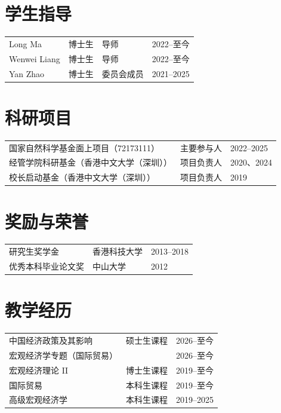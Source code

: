\documentclass[11pt]{res}
\begin{document}
\begin{resume}
\pagebreak
\section{\bf 学生指导}
\vspace{0.1in}
\begin{tabular}{llll}
\hspace{-0.42in} Long Ma      & 博士生 & 导师       & 2022--至今\\
\hspace{-0.42in} Wenwei Liang & 博士生 & 导师       & 2022--至今\\
\hspace{-0.42in} Yan Zhao     & 博士生 & 委员会成员 & 2021--2025
\end{tabular}

\section{\bf 科研项目}
\vspace{0.1in}
\begin{tabular}{lll}
\hspace{-0.42in} 国家自然科学基金面上项目（72173111）
  & 主要参与人 & 2022--2025\\
\hspace{-0.42in} 经管学院科研基金（香港中文大学（深圳））
  & 项目负责人 & 2020、2024\\
\hspace{-0.42in} 校长启动基金（香港中文大学（深圳））
  & 项目负责人 & 2019
\end{tabular}

\section{\bf 奖励与荣誉}
\vspace{0.1in}
\begin{tabular}{lll}
\hspace{-0.42in} 研究生奖学金
  & 香港科技大学 & 2013--2018\\
\hspace{-0.42in} 优秀本科毕业论文奖
  & 中山大学 & 2012
\end{tabular}

\section{\bf 教学经历}
\vspace{0.1in}
\begin{tabular}{lll}
\hspace{-0.42in} 中国经济政策及其影响
  & 硕士生课程 & 2026--至今\\
\hspace{-0.42in} 宏观经济学专题（国际贸易）
  & & 2026--至今\\
\hspace{-0.42in} 宏观经济理论 II
  & 博士生课程 & 2019--至今\\
\hspace{-0.42in} 国际贸易
  & 本科生课程 & 2019--至今\\
\hspace{-0.42in} 高级宏观经济学
  & 本科生课程 & 2019--2025
\end{tabular}


\end{resume}
\end{document}
